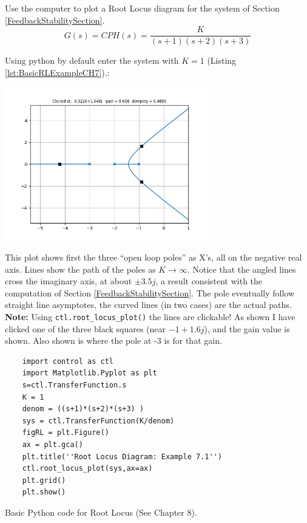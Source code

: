 \begin{ExampleSmall}
Use the computer to plot a Root Locus diagram for the system of Section \ref{FeedbackStabilitySection}.
\[
G(s)= CPH(s) = \frac{K}{(s+1)(s+2)(s+3)}
\]


Using python by default enter the system with $K=1$ (Listing \ref{lst:BasicRLExampleCH7}).:
%

\includegraphics[width=3.5in]{figs07/B47H33.png}

This plot shows first the three ``open loop poles'' as X's, all on the negative
real axis.  Lines show the path of the poles as $K\to\infty$. Notice that the
angled lines cross the imaginary axis, at about $\pm3.5j$,
a result consistent with the computation of Section \ref{FeedbackStabilitySection}.
The pole eventually follow straight line asymptotes,
the curved lines (in two cases) are the actual paths. {\bf Note: }
Using {\tt ctl.root\_locus\_plot()} the lines are clickable!  As shown
I have clicked one of the three black squares  (near $-1+1.6j$),
and the gain value is shown.   Also shown is where the pole at -3 is
for that gain.
\end{ExampleSmall}



\begin{listing}
  \begin{verbatim}
    import control as ctl
    import Matplotlib.Pyplot as plt
    s=ctl.TransferFunction.s
    K = 1
    denom = ((s+1)*(s+2)*(s+3) )
    sys = ctl.TransferFunction(K/denom)
    figRL = plt.Figure()
    ax = plt.gca()
    plt.title(''Root Locus Diagram: Example 7.1'')
    ctl.root_locus_plot(sys,ax=ax)
    plt.grid()
    plt.show()
  \end{verbatim}
  \caption{Basic Python code for Root Locus (See Chapter 8).}
  \label{lst:BasicRLExampleCH7}
\end{listing}

